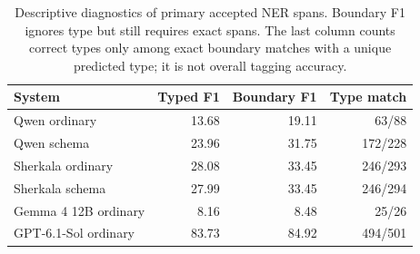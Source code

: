 \begin{table}[t]
\centering\footnotesize
\caption{Descriptive diagnostics of primary accepted NER spans. Boundary F1 ignores type but still requires exact spans. The last column counts correct types only among exact boundary matches with a unique predicted type; it is not overall tagging accuracy.}
\label{tab:boundary}
\begin{tabular}{lrrr}
\toprule
System & Typed F1 & Boundary F1 & Type match\\
\midrule
Qwen ordinary & 13.68 & 19.11 & 63/88\\
Qwen schema & 23.96 & 31.75 & 172/228\\
Sherkala ordinary & 28.08 & 33.45 & 246/293\\
Sherkala schema & 27.99 & 33.45 & 246/294\\
Gemma 4 12B ordinary & 8.16 & 8.48 & 25/26\\
GPT-6.1-Sol ordinary & 83.73 & 84.92 & 494/501\\
\bottomrule
\end{tabular}
\end{table}
